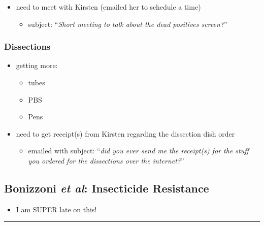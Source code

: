 \documentclass[letterpaper]{scrartcl}
\begin{document}
\begin{itemize}
\itemsep1pt\parskip0pt
\item
  need to meet with Kirsten (emailed her to schedule a time)

  \begin{itemize}
  \itemsep1pt\parskip0pt
  \item
    subject: ``\emph{Short meeting to talk about the dead positives
    screen?}''
  \end{itemize}
\end{itemize}

\subsubsection{Dissections}\label{dissections-1}

\begin{itemize}
\itemsep1pt\parskip0pt
\item
  getting more:

  \begin{itemize}
  \itemsep1pt\parskip0pt
  \item
    tubes
  \item
    PBS
  \item
    Pens
  \end{itemize}
\item
  need to get receipt(s) from Kirsten regarding the dissection dish
  order

  \begin{itemize}
  \itemsep1pt\parskip0pt
  \item
    emailed with subject: ``\emph{did you ever send me the receipt(s)
    for the stuff you ordered for the dissections over the internet?}''
  \end{itemize}
\end{itemize}

\subsection{Bonizzoni \emph{et al}: Insecticide
Resistance}\label{bonizzoni-et-al-insecticide-resistance}

\begin{itemize}
\itemsep1pt\parskip0pt
\item
  I am SUPER late on this!
\end{itemize}

\begin{center}\rule{0.5\linewidth}{\linethickness}\end{center}
\end{document}
